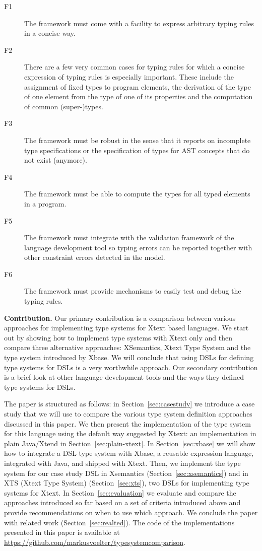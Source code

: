 \begin{description}
  \item[F1] The framework must come with a facility to express arbitrary typing
  rules in a concise way. 
  \item[F2] There are a few very common cases for typing rules for which a
  concise expression of typing rules is especially important. These include the 
  assignment of fixed types to program elements, the derivation of the type of one 
  element from the type of one of its properties and the computation of common (super-)types.
  \item[F3] The framework must be robust in the sense that it reports on
  incomplete type specifications or the specification of types for AST concepts
  that do not exist (anymore).
  \item[F4] The framework must be able to compute the types for all typed
  elements in a program. 
  \item[F5]  The framework must integrate with the validation framework of the
  language development tool so typing errors can be reported together with other
  constraint errors detected in the model.
  \item[F6]  The framework must provide mechanisms to easily test and debug the
  typing rules.
\end{description}


\textbf{Contribution.} Our primary contribution is a comparison between various
approaches for implementing type systems for Xtext based languages. We start out
by showing how to implement type systems with Xtext only and then compare three
alternative approaches: XSemantics, Xtext Type System and the type system introduced 
by Xbase. We will conclude that using DSLs for defining type systems for DSLs is
a very worthwhile approach. Our secondary contribution is a brief look
at other language development tools and the ways they defined type systems for
DSLs.

The paper is structured as follows: in Section~\ref{sec:casestudy} we
introduce a case study that we will use to compare the various type system definition approaches discussed in this paper.
We then
present the implementation of the type system for this language using the
default way suggested by Xtext: an implementation in plain Java/Xtend 
in Section~\ref{sec:plain-xtext}. In Section~\ref{sec:xbase} we will show how to
integrate a DSL type system with Xbase, a reusable expression language, integrated
with Java, and shipped with Xtext. Then, we implement
the type system for our case study DSL in Xsemantics (Section~\ref{sec:xsemantics}) and 
in XTS (Xtext Type System) (Section~\ref{sec:xts}), two DSLs for implementing
type systems for Xtext. In Section~\ref{sec:evaluation} we evaluate and compare
the approaches introduced so far based on a set of criteria introduced above and
provide recommendations on when to use which approach.  We conclude the paper
with related work (Section~\ref{sec:realted}).
The
code of the implementations presented in this paper is available at \\
\url{https://github.com/markusvoelter/typesystemcomparison}.

